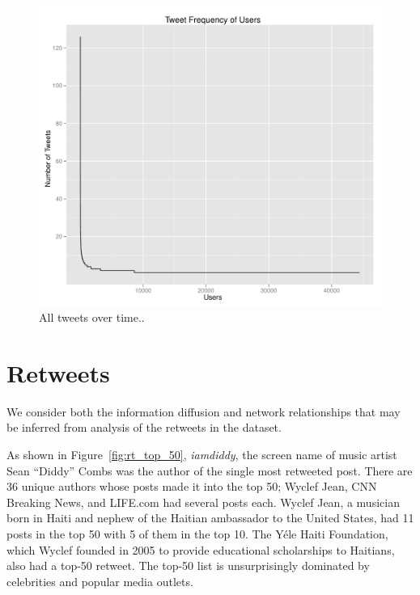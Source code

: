 \documentclass[a4paper, 11pt, titlepage]{article}
\begin{document}
\begin{figure}[h]
\centering
\includegraphics[width=120mm]{../figures/all_tweets_by_users}
\caption{All tweets over time..}
\label{fig:all_tweets_by_users}
\end{figure}

\section{Retweets}

We consider both the information diffusion and network relationships that may be inferred from analysis of the retweets in the dataset.

As shown in Figure~\ref{fig:rt_top_50}, \textit{iamdiddy}, the screen name of music artist Sean ``Diddy'' Combs was the author of the single most retweeted post.  There are 36 unique authors whose posts made it into the top 50; Wyclef Jean, CNN Breaking News, and LIFE.com had several posts each.  Wyclef Jean, a musician born in Haiti and nephew of the Haitian ambassador to the United States, had 11 posts in the top 50 with 5 of them in the top 10.  The Y\'{e}le Haiti Foundation, which Wyclef founded in 2005 to provide educational scholarships to Haitians, also had a top-50 retweet.  The top-50 list is unsurprisingly dominated by celebrities and popular media outlets.
\end{document}
